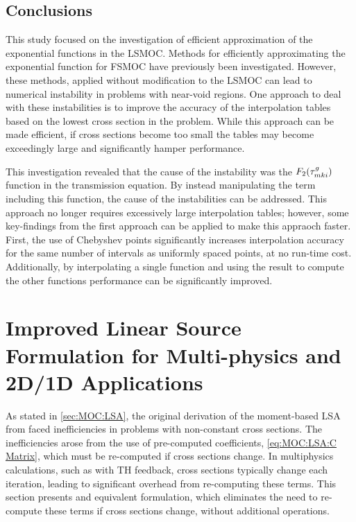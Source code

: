 {{    \subsection{Conclusions}{\label{ssec:LSMOC:ET:Conclusions}
      This study focused on the investigation of efficient approximation of the exponential functions in the \ac{LSMOC}.
      Methods for efficiently approximating the exponential function for \ac{FSMOC} have previously been investigated.
      However, these methods, applied without modification to the \ac{LSMOC} can lead to numerical instability in problems with near-void regions.
      One approach to deal with these instabilities is to improve the accuracy of the interpolation tables based on the lowest cross section in the problem.
      While this approach can be made efficient, if cross sections become too small the tables may become exceedingly large and significantly hamper performance.

      This investigation revealed that the cause of the instability was the $F_2(\segopt)$ function in the transmission equation.
      By instead manipulating the term including this function, the cause of the instabilities can be addressed.
      This approach no longer requires excessively large interpolation tables; however, some key-findings from the first approach can be applied to make this appraoch faster.
      First, the use of Chebyshev points significantly increases interpolation accuracy for the same number of intervals as uniformly spaced points, at no run-time cost.
      Additionally, by interpolating a single function and using the result to compute the other functions performance can be significantly improved.
    }
  }
  \section{Improved Linear Source Formulation for Multi-physics and 2D/1D Applications}{\label{sec:Improved Linear Source Formulation for Multi-physics and 2D/1D Applications}
    As stated in \cref{sec:MOC:LSA}, the original derivation of the moment-based \acf{LSA} from \citet{Ferrer2016} faced inefficiencies in problems with non-constant cross sections.
    The inefficiencies arose from the use of pre-computed coefficients, \cref{eq:MOC:LSA:C Matrix}, which must be re-computed if cross sections change.
    In multiphysics calculations, such as with \ac{TH} feedback, cross sections typically change each iteration, leading to significant overhead from re-computing these terms.
    This section presents and equivalent formulation, which eliminates the need to re-compute these terms if cross sections change, without additional operations.

}}
